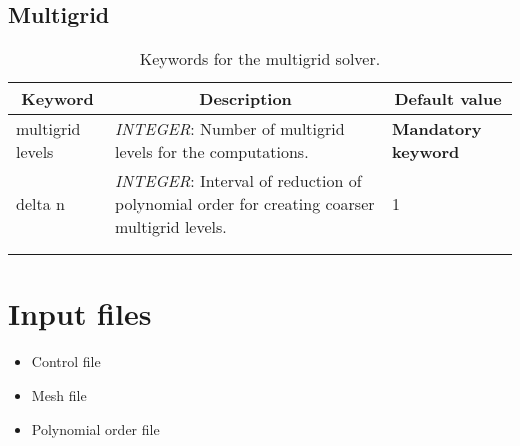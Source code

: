 \documentclass[a4paper,10pt]{report}
\begin{document}
\section{Multigrid}
\begin{table}[htbp]
\caption{Keywords for the multigrid solver.}
\begin{tabular}{|l|p{10cm}|p{2.2cm}|}
\hline
\multicolumn{1}{|c|}{Keyword} & \multicolumn{1}{c|}{Description} & \multicolumn{1}{c|}{Default value} \\ \hline

multigrid levels & \textit{INTEGER}: Number of multigrid levels for the computations. & \textbf{Mandatory keyword} \\ \hline

delta n          & \textit{INTEGER}: Interval of reduction of polynomial order for creating coarser multigrid levels.& 1 \\ \hline
   &  &  \\ \hline
    &  &  \\ \hline
\end{tabular}
\label{tab:multigridKey}
\end{table}

\chapter{Input files}
\begin{itemize}
\item Control file
\item Mesh file
\item Polynomial order file
\end{itemize}


\end{document}

